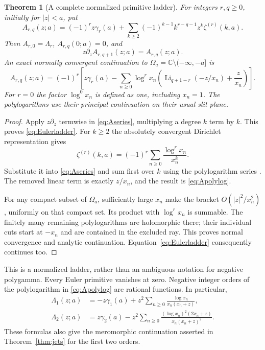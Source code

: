 \documentclass[11pt]{article}
\numberwithin{equation}{section}
\newtheorem{theorem}{Theorem}[section]
\theoremstyle{definition}\newtheorem{definition}[theorem]{Definition}
\theoremstyle{remark}\newtheorem{remark}[theorem]{Remark}
\DeclareMathOperator{\Li}{Li}
\newcommand{\C}{\mathbb C}\newcommand{\Q}{\mathbb Q}
\begin{document}
\begin{theorem}[A complete normalized primitive ladder]
\label{thm:primitives}
For integers $r,q\ge0$, initially for $|z|<a$, put
\begin{equation}
 A_{r,q}(z;a)=(-1)^rz\gamma_r(a)+
   \sum_{k\ge2}(-1)^{k-1}k^{r-q-1}z^k\zeta^{(r)}(k,a).
 \label{eq:Aseries}
\end{equation}
Then $A_{r,0}=\Lambda_r$, $A_{r,q}(0;a)=0$, and
\begin{equation}
 z\partial_z A_{r,q+1}(z;a)=A_{r,q}(z;a).
 \label{eq:Eulerladder}
\end{equation}
An exact normally convergent continuation to
$\Omega_a=\C\setminus(-\infty,-a]$ is
\begin{equation}
 \boxed{A_{r,q}(z;a)=(-1)^r\left[
 z\gamma_r(a)-\sum_{n\ge0}\log^r x_n
       \left(\Li_{q+1-r}(-z/x_n)+\frac z{x_n}\right)\right]}.
 \label{eq:Apolylog}
\end{equation}
For $r=0$ the factor $\log^0 x_n$ is defined as one, including $x_n=1$.
The polylogarithms use their principal continuation on their usual slit
plane.
\end{theorem}
\begin{proof}
Apply $z\partial_z$ termwise in \eqref{eq:Aseries}, multiplying a degree
$k$ term by $k$. This proves \eqref{eq:Eulerladder}. For $k\ge2$ the
absolutely convergent Dirichlet representation gives
\[
 \zeta^{(r)}(k,a)=(-1)^r\sum_{n\ge0}\frac{\log^r x_n}{x_n^k}.
\]
Substitute it into \eqref{eq:Aseries} and sum first over $k$ using the
polylogarithm series \cite{DLMFpolylog}. The removed linear term is exactly
$z/x_n$, and the result is \eqref{eq:Apolylog}.

For any compact subset of $\Omega_a$, sufficiently large $x_n$ make the
bracket $O(|z|^2/x_n^2)$, uniformly on that compact set. Its product with
$\log^r x_n$ is summable. The finitely many remaining polylogarithms are
holomorphic there; their individual cuts start at $-x_n$ and are contained
in the excluded ray. This proves normal convergence and analytic
continuation. Equation~\eqref{eq:Eulerladder} consequently continues too.
\end{proof}
This is a normalized ladder, rather than an ambiguous notation for negative
polygamma. Every Euler primitive vanishes at zero. Negative integer orders
of the polylogarithm in \eqref{eq:Apolylog} are rational functions.
In particular,
\begin{align}
 \Lambda_1(z;a)&=-z\gamma_1(a)
   +z^2\sum_{n\ge0}\frac{\log x_n}{x_n(x_n+z)},
 \label{eq:L1rational}\\
 \Lambda_2(z;a)&=z\gamma_2(a)
   -z^2\sum_{n\ge0}\frac{(\log x_n)^2(2x_n+z)}{x_n(x_n+z)^2}.
 \label{eq:L2rational}
\end{align}
These formulas also give the meromorphic continuation asserted in
Theorem~\ref{thm:jets} for the first two orders.
\end{document}
